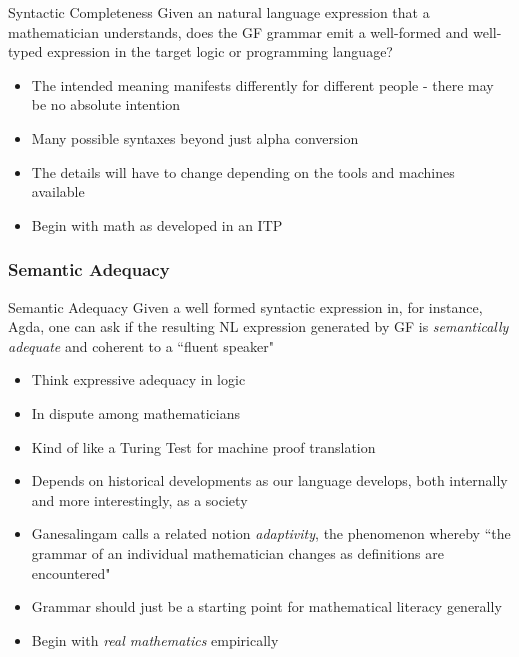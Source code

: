 \documentclass[10pt]{beamer}
\begin{document}
\begin{frame}
  \begin{block}{Syntactic Completeness}
Given an natural language expression that a mathematician
understands, does the GF grammar emit a well-formed and well-typed
expression in the target logic or programming language?
\end{block}

\begin{itemize}

\item The intended meaning manifests differently for different people - there
  may be no absolute intention
\item Many possible syntaxes beyond just alpha conversion
\item The details will have to change depending on the tools and machines available
\item Begin with math as developed in an ITP
\end{itemize}

\end{frame}

\begin{frame}

\frametitle{Semantic Adequacy}

\begin{block}{Semantic Adequacy}
  Given a well formed syntactic expression in, for instance, Agda, one
can ask if the resulting NL expression generated by GF is
\emph{semantically adequate} and coherent to a ``fluent speaker"
\end{block}

\begin{itemize}
  \item Think expressive adequacy in logic
  \item In dispute among mathematicians
  \item Kind of like a Turing Test for machine proof translation 
  \item Depends on historical developments as our language develops, both
    internally and more interestingly, as a society
  \item Ganesalingam calls a related notion \emph{adaptivity}, the phenomenon whereby ``the
    grammar of an individual mathematician changes as definitions are encountered"
  \item Grammar should just be a starting point for mathematical literacy generally
  \item Begin with \emph{real mathematics} empirically

\end{itemize}


\end{frame}
\end{document}
